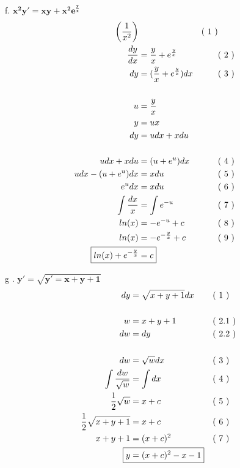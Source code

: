 \documentclass{article}
\newcommand{\newLine}[3]{ #1 & = #2 && \text{(#3)}\\ }
\newcommand{\finalAnswer}[2]{ \Aboxed{ #1 & = #2 } }
\newcommand{\p}[1]{ \left( #1 \right) }
\newcommand{\newProblem}[2]{ \hspace{10mm} #1. $
\boldsymbol{ #2 }
$  \break }
\newcommand{\e}[1]{e^{#1}}
\newcommand{\homogenea}{
    u & = \frac{y}{x} \\
    y & = ux \\
    dy & = udx + xdu\\
}
\begin{document}
\begin{flushleft}
        \newProblem{f}{ x^2 y' = xy + x^2 e^{\frac{y}{x}} }
            \begin{align*}
                \newLine{ [ x^2 y' } { xy + x^2 e^{ \frac{y}{x} } ] \p{ \frac{1}{x^2} } } { 1 }
                \newLine{ \frac{dy}{dx} } { \frac{y}{x} + e^{ \frac{y}{x} } } { 2 }
                \newLine{ dy } { ( \frac{y}{x} + \e{\frac{y}{x}})dx } { 3 }
                \\
                \homogenea
                \\
                \newLine{ udx + xdu } { ( u + \e{u} )dx } { 4 }
                \newLine{ udx - ( u + \e{u} )dx } { xdu } { 5 }
                \newLine{ \e{u} dx } { xdu } { 6 }
                \newLine{ \int \frac{dx}{x} } { \int \e{-u} } { 7 }
                \newLine{ ln(x) } { -\e{-u} + c } { 8 }
                \newLine{ ln(x) } { -\e{-\frac{y}{x}} + c} { 9 }
                \finalAnswer{ ln(x) + \e{-\frac{y}{x}} } { c }
            \end{align*}

        \newProblem{ g }{ y' = \sqrt{y' = x + y +1 } }
            \begin{align*}
                \newLine{ dy } { \sqrt{ x + y + 1 }dx } { 1 }
                \\
                \newLine{ w } { x+y+1 } { 2.1 }
                \newLine{ dw } { dy } { 2.2 }
                \\
                \newLine{ dw } { \sqrt{w}dx } { 3 }
                \newLine{ \int \frac{dw}{\sqrt{w}} } {\int dx } { 4 }
                \newLine{ \frac{1}{2} \sqrt{w} } { x + c } { 5 }
                \newLine{ \frac{1}{2} \sqrt{x+y+1} } { x + c } { 6 }
                \newLine{ x + y+ 1 } { (x + c) ^ 2 } { 7 }
                \finalAnswer{ y }{ (x + c)^2 - x - 1}
            \end{align*}


\end{flushleft}
\end{document}
